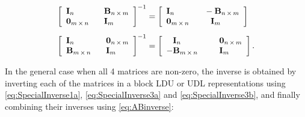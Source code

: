 \documentclass[graybox,envcountchap,sectrefs]{svmono}\usepackage[]{graphicx}\usepackage[]{xcolor}
\begin{document}
\begin{appendices}
\begin{subequations}
\begin{align}
\left[\begin{array}{ll}
\mathrm{\mathbf{I}}_{n} & \hphantom{-}\mathrm{\mathbf{B}}_{n\,\times\,m}\\
\mathbf{0}_{m\,\times\,n} & \hphantom{-}\mathrm{\mathbf{I}}_{m}
\end{array}\right]^{-1} & =\left[\begin{array}{ll}
\mathrm{\mathbf{I}}_{n} & \mathrm{\hphantom{-}-\mathbf{B}}_{n\,\times\,m}\\
\mathbf{0}_{m\,\times\,n} & \hphantom{-}\mathrm{\hphantom{-}\mathbf{I}}_{m}
\end{array}\right]\label{eq:SpecialInverse3a}\\[0.5em]
\left[\begin{array}{ll}
\mathrm{\mathbf{I}}_{n} & \hphantom{-}\mathbf{0}_{n\,\times\,m}\\
\mathrm{\mathbf{B}}_{m\,\times\,n} & \hphantom{-}\mathrm{\mathbf{I}}_{m}
\end{array}\right]^{-1} & =\left[\begin{array}{ll}
\hphantom{-}\mathrm{\mathbf{I}}_{n} & \hphantom{-}\hphantom{-}\mathbf{0}_{n\,\times\,m}\\
-\mathrm{\mathbf{B}}_{m\,\times\,n} & \hphantom{-}\mathrm{\hphantom{-}\mathbf{I}}_{m}
\end{array}\right].\label{eq:SpecialInverse3b}
\end{align}
\end{subequations}

In the general case when all 4 matrices are non-zero, the inverse
is obtained by inverting each of the matrices in a block LDU or UDL
representations using \eqref{eq:SpecialInverse1a}, \eqref{eq:SpecialInverse3a}
and \eqref{eq:SpecialInverse3b}, and finally combining their inverses
using \eqref{eq:ABinverse}:


\end{appendices}
\end{document}
